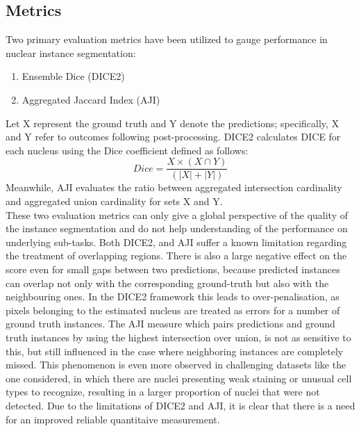 \documentclass[target=bach,aauheader=,style=]{thud}
\begin{document}
\subsection{Metrics}
Two primary evaluation metrics have been utilized to gauge performance in nuclear instance segmentation:
\begin{enumerate}
    \item Ensemble Dice (DICE2) \cite{vu2019methods}
    \item Aggregated Jaccard Index (AJI) \cite{kumar2017dataset}
\end{enumerate}
Let X represent the ground truth and Y denote the predictions; specifically, X and Y refer to outcomes following post-processing. DICE2 calculates DICE for each nucleus using the Dice coefficient defined as follows:
\begin{equation}
    Dice = \frac{X\times(X\cap Y)}{(|X|+|Y|)}
\end{equation}
Meanwhile, AJI evaluates the ratio between aggregated intersection cardinality and aggregated union cardinality for sets X and Y.\\
These two evaluation metrics can only give a global perspective of the quality of the instance segmentation and do not help understanding of the performance on underlying sub-tasks.
Both DICE2, and AJI suffer a known limitation regarding the treatment of overlapping regions.
There is also a large negative effect on the score even for small gaps between two predictions, because predicted instances can overlap not only with the corresponding ground-truth but also with the neighbouring ones.
In the DICE2 framework this leads to over-penalisation, as pixels belonging to the estimated nucleus are treated as errors for a number of ground truth instances.
The AJI measure which pairs predictions and ground truth instances by using the highest intersection over union, is not as sensitive to this, but still influenced in the case where neighboring instances are completely missed.
This phenomenon is even more observed in challenging datasets like the one considered, in which there are nuclei presenting weak staining or unusual cell types to recognize, resulting in a larger proportion of nuclei that were not detected.
Due to the limitations of DICE2 and AJI, it is clear that there is a need for an improved reliable quantitaive measurement.\\
\end{document}
